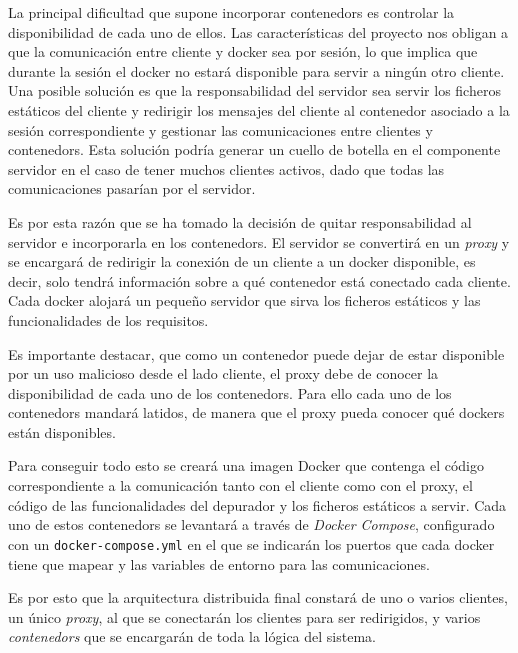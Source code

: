 La principal dificultad que supone incorporar \glspl{contenedor} es controlar la disponibilidad de cada uno de ellos. Las características del proyecto nos obligan a que la comunicación entre cliente y docker sea por sesión, lo que implica que durante la sesión el docker no estará disponible para servir a ningún otro cliente. Una posible solución es que la responsabilidad del servidor sea servir los ficheros estáticos del cliente y redirigir los mensajes del cliente al contenedor asociado a la sesión correspondiente y gestionar las comunicaciones entre clientes y \glspl{contenedor}. Esta solución podría generar un cuello de botella en el componente servidor en el caso de tener muchos clientes activos, dado que todas las comunicaciones pasarían por el servidor.



Es por esta razón que se ha tomado la decisión de quitar responsabilidad al servidor e incorporarla en los \glspl{contenedor}. El servidor se convertirá en un \textit{\gls{proxy}} y se encargará de redirigir la conexión de un cliente a un docker disponible, es decir, solo tendrá información sobre a qué \gls{contenedor} está conectado cada cliente. 
Cada docker alojará un pequeño servidor que sirva los ficheros estáticos y las funcionalidades de los requisitos.


Es importante destacar, que como un \gls{contenedor} puede dejar de estar disponible por un uso malicioso desde el lado cliente, el \gls{proxy} debe de conocer la disponibilidad de cada uno de los \glspl{contenedor}. Para ello cada uno de los \glspl{contenedor} mandará latidos, de manera que el \gls{proxy} pueda conocer qué dockers están disponibles.

Para conseguir todo esto se creará una \gls{imagen Docker} que contenga el código correspondiente a la comunicación tanto con el cliente como con el \gls{proxy}, el código de las funcionalidades del depurador y los ficheros estáticos a servir. Cada uno de estos \glspl{contenedor} se levantará a través de \textit{Docker Compose}, configurado con un \texttt{docker-compose.yml} en el que se indicarán los puertos que cada docker tiene que mapear y las variables de entorno para las comunicaciones. 

Es por esto que la arquitectura distribuida final constará de uno o varios clientes, un único \textit{proxy}, al que se conectarán los clientes para ser redirigidos, y varios \textit{\glspl{contenedor}} que se encargarán de toda la lógica del sistema.

